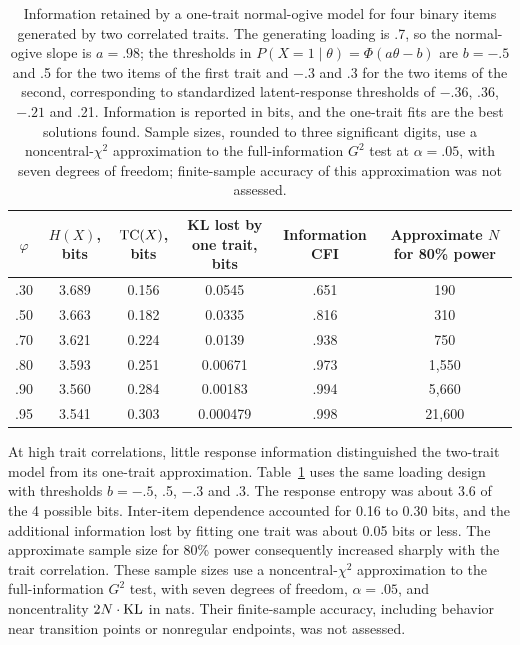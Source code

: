 \begin{table}[t]
\centering\small
\caption{Information retained by a one-trait normal-ogive model for four binary items generated by two correlated traits. The generating loading is .7, so the normal-ogive slope is $a=.98$; the thresholds in $P(X=1\mid\theta)=\Phi(a\theta-b)$ are $b=-.5$ and .5 for the two items of the first trait and $-.3$ and .3 for the two items of the second, corresponding to standardized latent-response thresholds of $-.36$, .36, $-.21$ and .21. Information is reported in bits, and the one-trait fits are the best solutions found. Sample sizes, rounded to three significant digits, use a noncentral-$\chi^2$ approximation to the full-information $G^2$ test at $\alpha=.05$, with seven degrees of freedom; finite-sample accuracy of this approximation was not assessed.}
\label{tab:binary-information}
\begin{tabular}{cccccc}
\toprule
$\varphi$ & $H(X)$, bits & $\operatorname{TC}(X)$, bits & KL lost by one trait, bits & Information CFI & \shortstack{Approximate $N$\\for 80\% power} \\
\midrule
.30 & 3.689 & 0.156 & 0.0545 & .651 & 190 \\
.50 & 3.663 & 0.182 & 0.0335 & .816 & 310 \\
.70 & 3.621 & 0.224 & 0.0139 & .938 & 750 \\
.80 & 3.593 & 0.251 & 0.00671 & .973 & 1,550 \\
.90 & 3.560 & 0.284 & 0.00183 & .994 & 5,660 \\
.95 & 3.541 & 0.303 & 0.000479 & .998 & 21,600 \\
\bottomrule
\end{tabular}
\end{table}

At high trait correlations, little response information distinguished the two-trait model from its one-trait approximation. Table~\ref{tab:binary-information} uses the same loading design with thresholds $b=-.5$, .5, $-.3$ and .3. The response entropy was about 3.6 of the 4 possible bits. Inter-item dependence accounted for 0.16 to 0.30 bits, and the additional information lost by fitting one trait was about 0.05 bits or less. The approximate sample size for 80\% power consequently increased sharply with the trait correlation. These sample sizes use a noncentral-$\chi^2$ approximation to the full-information $G^2$ test, with seven degrees of freedom, $\alpha=.05$, and noncentrality $2N\cdot\operatorname{KL}$ in nats. Their finite-sample accuracy, including behavior near transition points or nonregular endpoints, was not assessed.
